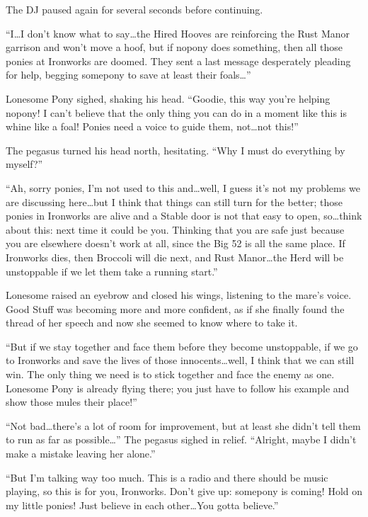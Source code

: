 The DJ paused again for several seconds before continuing.

``{\rt I\dots I don't know what to say\dots the Hired Hooves are reinforcing the Rust Manor garrison and won't move a hoof, but if nopony does something, then all those ponies at Ironworks are doomed. They sent a last message desperately pleading for help, begging somepony to save at least their foals\dots}''

Lonesome Pony sighed, shaking his head. ``Goodie, this way you're helping nopony! I can't believe that the only thing you can do in a moment like this is whine like a foal! Ponies need a voice to guide them, not\dots not this!''

The pegasus turned his head north, hesitating. ``Why I must do everything by myself?''

``{\rt Ah, sorry ponies, I'm not used to this and\dots well, I guess it's not my problems we are discussing here\dots but I think that things can still turn for the better; those ponies in Ironworks are alive and a Stable door is not that easy to open, so\dots think about this: next time it could be you. Thinking that you are safe just because you are elsewhere doesn't work at all, since the Big 52 is all the same place. If Ironworks dies, then Broccoli will die next, and Rust Manor\dots the Herd will be unstoppable if we let them take a running start.}''

Lonesome raised an eyebrow and closed his wings, listening to the mare's voice. Good Stuff was becoming more and more confident, as if she finally found the thread of her speech and now she seemed to know where to take it.

``{\rt But if we stay together and face them before they become unstoppable, if we go to Ironworks and save the lives of those innocents\dots well, I think that we can still win. The only thing we need is to stick together and face the enemy as one. Lonesome Pony is already flying there; you just have to follow his example and show those mules their place!}''

``Not bad\dots there's a lot of room for improvement, but at least she didn't tell them to run as far as possible\dots'' The pegasus sighed in relief. ``Alright, maybe I didn't make a mistake leaving her alone.''

``{\rt But I'm talking way too much. This is a radio and there should be music playing, so this is for you, Ironworks. Don't give up: somepony is coming! Hold on my little ponies! Just believe in each other\dots You gotta believe.}''


